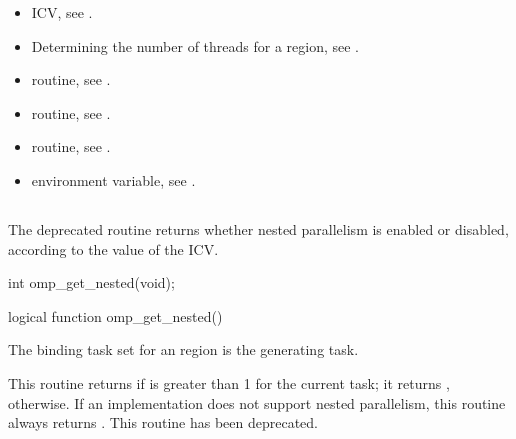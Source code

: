 \crossreferences
\begin{itemize}
\item {} ICV, see
.

\item Determining the number of threads for a  region, see
.

\item {} routine, see .

\item {} routine, see
.

\item {} routine, see
.

\item {} environment variable, see
.
\end{itemize}



\subsection{}
\label{subsec:omp_get_nested}
\summary
The deprecated  routine returns whether 
nested parallelism is enabled or disabled, according to the 
value of the  ICV.

\format
\begin{ccppspecific}
\begin{ompcFunction}
int omp_get_nested(void);
\end{ompcFunction}
\end{ccppspecific}

\begin{fortranspecific}
\begin{ompfFunction}
logical function omp_get_nested()
\end{ompfFunction}
\end{fortranspecific}

\binding
The binding task set for an  region is the generating task.

\effect
This routine returns  if  is greater 
than 1 for the current task; it returns , otherwise. If an
implementation does not support nested parallelism, this routine always
returns .  This routine has been deprecated.

